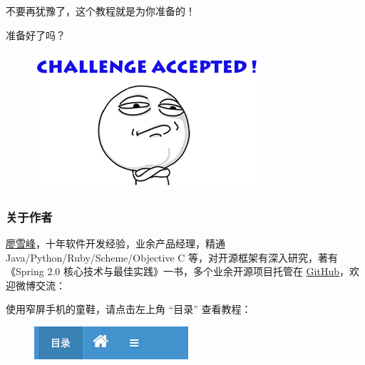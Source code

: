 不要再犹豫了，这个教程就是为你准备的！

准备好了吗？

 
 \begin{figure}[htp]
	\centering
	\includegraphics[width=0.6\linewidth]{fig/9229153429258240.png}
\end{figure}


\hypertarget{ux5173ux4e8eux4f5cux8005}{%
\subsubsection{关于作者}\label{ux5173ux4e8eux4f5cux8005}}

\href{http://weibo.com/liaoxuefeng}{廖雪峰}，十年软件开发经验，业余产品经理，精通
Java/Python/Ruby/Scheme/Objective C
等，对开源框架有深入研究，著有《Spring 2.0
核心技术与最佳实践》一书，多个业余开源项目托管在
\href{https://github.com/michaelliao}{GitHub}，欢迎微博交流：

使用窄屏手机的童鞋，请点击左上角 ``目录'' 查看教程：

 
 \begin{figure}[htp]
	\centering
	\includegraphics[width=0.6\linewidth]{fig/1311543585144897l.png}
\end{figure}


